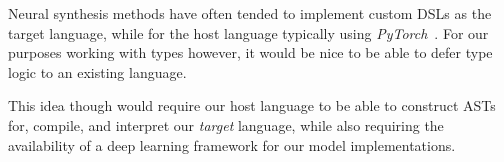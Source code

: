 \documentclass{article}
\begin{document}
Neural synthesis methods have often tended to implement custom DSLs as the target language,
while for the host language typically using \emph{PyTorch}~\citep{pytorch}.
For our purposes working with types however,
it would be nice to be able to defer type logic to an existing language.%

This idea though would require our host language
to be able to construct ASTs for, compile,
and interpret our \emph{target} language,
while also requiring the availability of a
deep learning framework for our model implementations.

\end{document}
